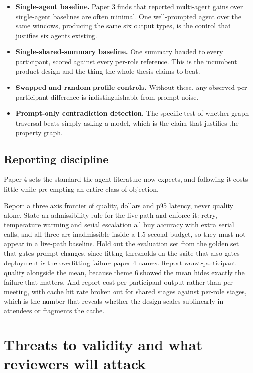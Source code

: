 \begin{itemize}
\item \textbf{Single-agent baseline.} Paper 3 finds that reported multi-agent
gains over single-agent baselines are often minimal. One well-prompted agent
over the same windows, producing the same six output types, is the control that
justifies six agents existing.
\item \textbf{Single-shared-summary baseline.} One summary handed to every
participant, scored against every per-role reference. This is the incumbent
product design and the thing the whole thesis claims to beat.
\item \textbf{Swapped and random profile controls.} Without these, any observed
per-participant difference is indistinguishable from prompt noise.
\item \textbf{Prompt-only contradiction detection.} The specific test of
whether graph traversal beats simply asking a model, which is the claim that
justifies the property graph.
\end{itemize}

\subsection{Reporting discipline}

Paper 4 sets the standard the agent literature now expects, and following it
costs little while pre-empting an entire class of objection.

Report a three axis frontier of quality, dollars and p95 latency, never quality
alone. State an admissibility rule for the live path and enforce it: retry,
temperature warming and serial escalation all buy accuracy with extra serial
calls, and all three are inadmissible inside a 1.5 second budget, so they must
not appear in a live-path baseline. Hold out the evaluation set from the golden
set that gates prompt changes, since fitting thresholds on the suite that also
gates deployment is the overfitting failure paper 4 names. Report
worst-participant quality alongside the mean, because theme 6 showed the mean
hides exactly the failure that matters. And report cost per participant-output
rather than per meeting, with cache hit rate broken out for shared stages
against per-role stages, which is the number that reveals whether the design
scales sublinearly in attendees or fragments the cache.

\section{Threats to validity and what reviewers will attack}

